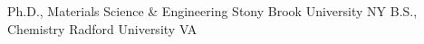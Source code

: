 
\begin{cventries}
  \cventry
    {Ph.D., Materials Science \& Engineering}
    {Stony Brook University}
    {NY}
    {}
    {}
  \cventry
    {B.S., Chemistry}
    {Radford University}
    {VA}
    {}
    {}
\end{cventries}
